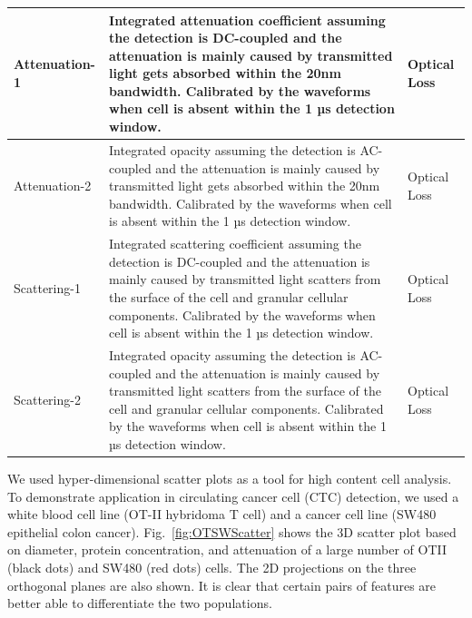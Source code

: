 \documentclass[aps,pra,preprint,superscriptaddress]{revtex4-1}
\begin{document}
\begin{table}[H]
\begin{tabular}{|p{}|p{}|p{}|}
Attenuation-1	 &Integrated attenuation coefficient assuming the detection is DC-coupled and the attenuation is mainly caused by transmitted light gets absorbed within the 20nm bandwidth. Calibrated by the waveforms when cell is absent within the 1 µs detection window.	 &Optical Loss\\ \hline
Attenuation-2	 &Integrated opacity assuming the detection is AC-coupled and the attenuation is mainly caused by transmitted light gets absorbed within the 20nm bandwidth. Calibrated by the waveforms when cell is absent within the 1 µs detection window.  &Optical Loss\\ \hline
Scattering-1	 &Integrated scattering coefficient assuming the detection is DC-coupled and the attenuation is mainly caused by transmitted light scatters from the surface of the cell and granular cellular components. Calibrated by the waveforms when cell is absent within the 1 µs detection window.	 &Optical Loss\\ \hline
Scattering-2	 &Integrated opacity assuming the detection is AC-coupled and the attenuation is mainly caused by transmitted light scatters from the surface of the cell and granular cellular components. Calibrated by the waveforms when cell is absent within the 1 µs detection window.	 &Optical Loss\\ 
\hline
\end{tabular}
\end{table}

We used hyper-dimensional scatter plots as a tool for high content cell analysis. To demonstrate application in circulating cancer cell (CTC) detection, we used a white blood cell line (OT-II hybridoma T cell) and a cancer cell line (SW480 epithelial colon cancer). Fig.~\ref{fig:OTSWScatter} shows the 3D scatter plot based on diameter, protein concentration, and attenuation of a large number of OTII (black dots) and SW480 (red dots) cells. The 2D projections on the three orthogonal planes are also shown. It is clear that certain pairs of features are better able to differentiate the two populations.
\end{document}

